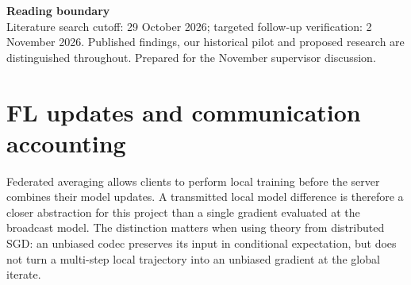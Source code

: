 \begin{reviewcallout}\textbf{Reading boundary}\\Literature search cutoff: 29 October 2026; targeted follow-up verification: 2 November 2026. Published findings, our historical pilot and proposed research are distinguished throughout. Prepared for the November supervisor discussion.\end{reviewcallout}

\begin{abstract}

Communication compression in federated learning changes both the representation of an update and, potentially, the optimization trajectory. This review connects the main research lines: stochastic quantization, coordinate sparsification, error feedback, low-rank approximation, learned representations and source coding. It compares what is transmitted, the conditions behind error or convergence claims, and costs often hidden by nominal compression ratios. Adaptive methods already change precision across rounds and clients, exploit side information, or choose among compression strategies. Accordingly, an adaptive Lempel-Ziv contribution must be positioned more narrowly than the general idea of adaptive compression.

The thesis investigates second-stage LLZ tolerance selection after a fixed QSGD draw. A local reconstruction constraint makes candidate selection testable, but does not establish a learning-safe distortion budget. A separate DigiFace pilot illustrates the distinction: the tighter adaptive policy reduced training-upload bytes relative to lossless LLZ while retaining a similar selected validation accuracy in one seed, yet the change in total serialized communication was much smaller. The review identifies budget justification, feedback policy, computational overhead and confirmation evidence as the next methodological priorities. It makes no priority, statistical-equivalence or new convergence claim.

\end{abstract}

\tableofcontents\clearpage
{}
\setcounter{page}{1}

\section{FL updates and communication accounting}

Federated averaging allows clients to perform local training before the server combines their model updates. A transmitted local model difference is therefore a closer abstraction for this project than a single gradient evaluated at the broadcast model. The distinction matters when using theory from distributed SGD: an unbiased codec preserves its input in conditional expectation, but does not turn a multi-step local trajectory into an unbiased gradient at the global iterate. \parencite{mcmahan2017fedavg,wang2021fieldguide}

